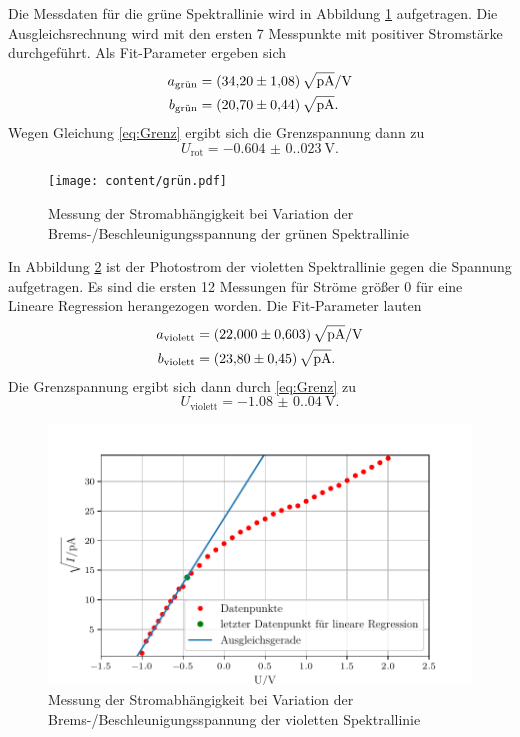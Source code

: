 \noindent Die Messdaten für die grüne Spektrallinie wird in Abbildung \ref{fig:grün}
aufgetragen. Die Ausgleichsrechnung wird mit den ersten 7 Messpunkte mit positiver 
Stromstärke durchgeführt.
Als Fit-Parameter ergeben sich
\begin{align*}
  a_\text{grün}&=\qty{34.2(1.08)}{\sqrt{\pico\ampere}\per\volt}\\
  b_\text{grün}&=\qty{20.7(0.44)}{\sqrt{\pico\ampere}}.\\
\end{align*}
Wegen Gleichung \eqref{eq:Grenz} ergibt sich die Grenzspannung dann zu
\begin{equation*}
  U_\text{rot}=\qty{-0.604(0.023)}{\volt}.
\end{equation*}
\begin{figure}[H]
  \centering
  \texttt{[image: content/grün.pdf]}
  \caption{Messung der Stromabhängigkeit bei Variation der Brems-/Beschleunigungsspannung der grünen Spektrallinie}
  \label{fig:grün}
\end{figure}

\noindent In Abbildung \ref{fig:violett} ist der Photostrom der violetten Spektrallinie gegen die 
Spannung aufgetragen. Es sind die ersten 12 Messungen für Ströme größer 0 für eine 
Lineare Regression herangezogen worden. Die Fit-Parameter lauten 
\begin{align*}
  a_\text{violett}&=\qty{22(0.603)}{\sqrt{\pico\ampere}\per\volt}\\
  b_\text{violett}&=\qty{23.8(0.45)}{\sqrt{\pico\ampere}}.\\
\end{align*}
Die Grenzspannung ergibt sich dann durch \eqref{eq:Grenz} zu
\begin{equation*}
  U_\text{violett}=\qty{-1.08(0.04)}{\volt}.
\end{equation*}
\begin{figure}[H]
  \centering
  \includegraphics{content/lila.pdf}
  \caption{Messung der Stromabhängigkeit bei Variation der Brems-/Beschleunigungsspannung der violetten Spektrallinie}
  \label{fig:violett}
\end{figure}
